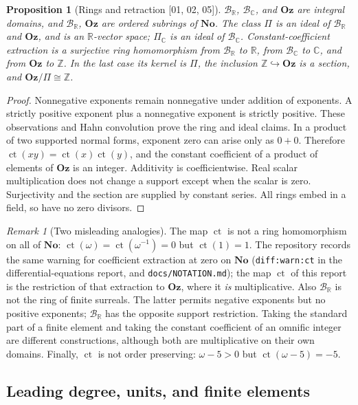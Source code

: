 \documentclass[11pt,oneside]{article}
\numberwithin{equation}{section}
\newtheorem{proposition}[proposition]{Proposition}
\theoremstyle{definition}
\theoremstyle{remark}
\newtheorem{remark}[remark]{Remark}
\newcommand{\No}{\mathbf{No}}
\newcommand{\Oz}{\mathbf{Oz}}
\newcommand{\Z}{\mathbb Z}
\newcommand{\R}{\mathbb R}
\newcommand{\C}{\mathbb C}
\newcommand{\BR}{\mathcal B_{\R}}
\newcommand{\BC}{\mathcal B_{\C}}
\newcommand{\ct}{\operatorname{ct}}
\newcommand{\src}[1]{\textup{\textsf{\small[#1]}}}
\newcommand{\replabel}[1]{\nolinkurl{#1}}
\newcommand{\fn}[1]{\nolinkurl{#1}}
\begin{document}
\begin{proposition}[Rings and retraction \src{01, 02, 05}]\label{odg:prop:ring}
$\BR$, $\BC$, and $\Oz$ are integral domains, and $\BR$, $\Oz$ are ordered
subrings of $\No$. The class $\Pi$ is an ideal of $\BR$ and $\Oz$, and is
an $\R$-vector space; $\Pi_{\C}$ is an ideal of $\BC$.
Constant-coefficient extraction is a surjective ring homomorphism from
$\BR$ to $\R$, from $\BC$ to $\C$, and from $\Oz$ to $\Z$. In the last case
its kernel is $\Pi$, the inclusion $\Z\hookrightarrow\Oz$ is a section, and
$\Oz/\Pi\cong\Z$.
\end{proposition}
\begin{proof}
Nonnegative exponents remain nonnegative under addition of exponents. A
strictly positive exponent plus a nonnegative exponent is strictly
positive. These observations and Hahn convolution prove the ring and ideal
claims. In a product of two supported normal forms, exponent zero can
arise only as $0+0$. Therefore $\ct(xy)=\ct(x)\ct(y)$, and the constant
coefficient of a product of elements of $\Oz$ is an integer. Additivity is
coefficientwise. Real scalar multiplication does not change a support except
when the scalar is zero. Surjectivity and the section are supplied by
constant series. All rings embed in a field, so have no zero divisors.
\end{proof}

\begin{remark}[Two misleading analogies]\label{odg:rem:notvaluation}
The map $\ct$ is not a ring homomorphism on all of $\No$:
$\ct(\omega)=\ct(\omega^{-1})=0$ but $\ct(1)=1$. The repository records the
same warning for coefficient extraction at zero on $\No$
(\replabel{diff:warn:ct} in the differential-equations report, and
\fn{docs/NOTATION.md}); the map $\ct$ of this report is the restriction of
that extraction to $\Oz$, where it \emph{is} multiplicative. Also $\BR$ is not
the ring of finite surreals. The latter permits negative exponents but no
positive exponents; $\BR$ has the opposite support restriction. Taking the
standard part of a finite element and taking the constant coefficient of an
omnific integer are different constructions, although both are multiplicative
on their own domains. Finally, $\ct$ is not order preserving:
$\omega-5>0$ but $\ct(\omega-5)=-5$.
\end{remark}

\subsection{Leading degree, units, and finite elements}
\end{document}
